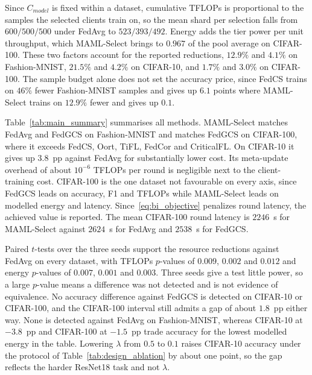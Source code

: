 \documentclass[journal]{IEEEtran}
\theoremstyle{remark}
\newcommand{\revision}[1]{#1}
\newcommand{\revtwo}[1]{#1}
\begin{document}
\revtwo{Since $C_{model}$ is fixed within a dataset, cumulative TFLOPs is proportional to the samples the selected clients train on, so the mean shard per selection falls from $600/500/500$ under FedAvg to $523/393/492$. Energy adds the tier power per unit throughput, which MAML-Select brings to $0.967$ of the pool average on CIFAR-100. These two factors account for the reported reductions, $12.9\%$ and $4.1\%$ on Fashion-MNIST, $21.5\%$ and $4.2\%$ on CIFAR-10, and $1.7\%$ and $3.0\%$ on CIFAR-100. The sample budget alone does not set the accuracy price, since FedCS trains on $46\%$ fewer Fashion-MNIST samples and gives up $6.1$ points where MAML-Select trains on $12.9\%$ fewer and gives up $0.1$.}

\revision{Table~\ref{tab:main_summary} summarises all methods. MAML-Select matches FedAvg and FedGCS on Fashion-MNIST and matches FedGCS on CIFAR-100, where it exceeds FedCS, Oort, TiFL, FedCor and CriticalFL. On CIFAR-10 it gives up $3.8$~pp against FedAvg for substantially lower cost. Its meta-update overhead of about $10^{-6}$ TFLOPs per round is negligible next to the client-training cost.} \revtwo{CIFAR-100 is the one dataset not favourable on every axis, since FedGCS leads on accuracy, F1 and TFLOPs while MAML-Select leads on modelled energy and latency. Since~\eqref{eq:bi_objective} penalizes round latency, the achieved value is reported. The mean CIFAR-100 round latency is $2246$~s for MAML-Select against $2624$~s for FedAvg and $2538$~s for FedGCS.}

\revision{Paired $t$-tests over the three seeds support the resource reductions against FedAvg on every dataset, with TFLOPs $p$-values of $0.009$, $0.002$ and $0.012$ and energy $p$-values of $0.007$, $0.001$ and $0.003$.} \revtwo{Three seeds give a test little power, so a large $p$-value means a difference was not detected and is not evidence of equivalence. No accuracy difference against FedGCS is detected on CIFAR-10 or CIFAR-100, and the CIFAR-100 interval still admits a gap of about $1.8$~pp either way. None is detected against FedAvg on Fashion-MNIST, whereas CIFAR-10 at $-3.8$~pp and CIFAR-100 at $-1.5$~pp trade accuracy for the lowest modelled energy in the table.} \revision{Lowering $\lambda$ from $0.5$ to $0.1$ raises CIFAR-10 accuracy under the protocol of Table~\ref{tab:design_ablation} by about one point, so the gap reflects the harder ResNet18 task and not $\lambda$.}
\end{document}
